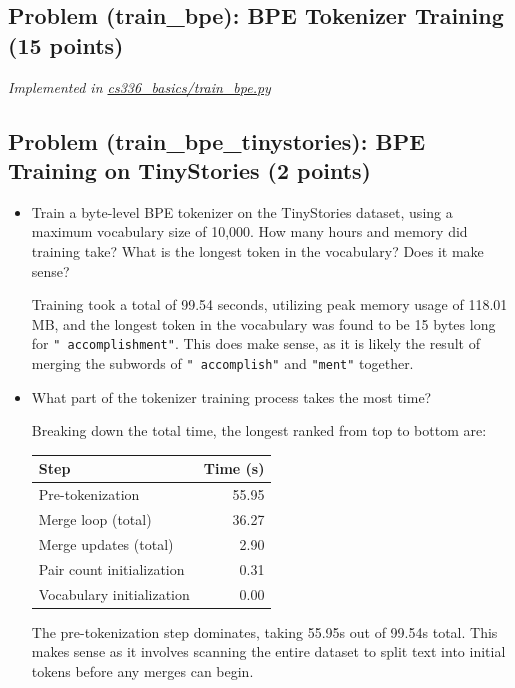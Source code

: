 \documentclass[letterpaper]{article}
\begin{document}
\subsection{Problem (train\_bpe): BPE Tokenizer Training (15 points)}

\textit{Implemented in  \href{https://github.com/echung32/ece405-assignment1-basics/blob/main/cs336_basics/train_bpe.py}{cs336\_basics/train\_bpe.py}}

\subsection{Problem (train\_bpe\_tinystories): BPE Training on TinyStories (2 points)}

\begin{itemize}
	\item[(a)] Train a byte-level BPE tokenizer on the TinyStories dataset, using a maximum vocabulary size
	of 10,000. How many hours and memory did training take? What is the longest token in the vocabulary? Does it make sense?

	Training took a total of 99.54 seconds, utilizing peak memory usage of 118.01 MB, and the longest token in the vocabulary was found to be 15 bytes long for \texttt{" accomplishment"}. This does make sense, as it is likely the result of merging the subwords of \texttt{" accomplish"} and \texttt{"ment"} together.

	\item[(b)] What part of the tokenizer training process takes the most time?

	Breaking down the total time, the longest ranked from top to bottom are:

\begin{center}
\begin{tabular}{lr}
\hline
\textbf{Step} & \textbf{Time (s)} \\
\hline
Pre-tokenization & 55.95 \\
Merge loop (total) & 36.27 \\
Merge updates (total) & 2.90 \\
Pair count initialization & 0.31 \\
Vocabulary initialization & 0.00 \\
\hline
\end{tabular}
\end{center}

	The pre-tokenization step dominates, taking 55.95s out of 99.54s total. This makes sense as it involves scanning the entire dataset to split text into initial tokens before any merges can begin.
\end{itemize}
\end{document}
